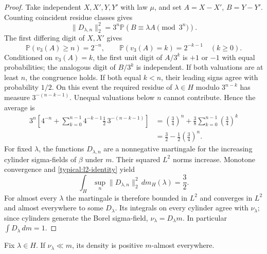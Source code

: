 \begin{proof}
Take independent $X,X',Y,Y'$ with law $\mu$, and set
$A=X-X'$, $B=Y-Y'$. Counting coincident residue classes gives
\[
 \|D_{\lambda,n}\|_2^2
       =3^n\mathbb P(B\equiv\lambda A\pmod{3^n}).
\]
The first differing digit of $X,X'$ gives
\[
 \mathbb P(v_3(A)\ge n)=2^{-n},\qquad
 \mathbb P(v_3(A)=k)=2^{-k-1}\quad(k\ge0).
\]
Conditioned on $v_3(A)=k$, the first unit digit of $A/3^k$
is $+1$ or $-1$ with equal probabilities; the analogous digit of
$B/3^k$ is independent. If both valuations are at least $n$, the
congruence holds. If both equal $k<n$, their leading signs agree
with probability $1/2$. On this event the required residue of
$\lambda\in H$ modulo $3^{n-k}$ has measure $3^{-(n-k-1)}$.
Unequal valuations below $n$ cannot contribute. Hence the average is
\begin{align*}
 3^n\left[4^{-n}+
   \sum_{k=0}^{n-1}4^{-k-1}\frac12\,3^{-(n-k-1)}\right]
 &=\left(\frac34\right)^n+
   \frac38\sum_{k=0}^{n-1}\left(\frac34\right)^k\\
 &=\frac32-\frac12\left(\frac34\right)^n.
\end{align*}
For fixed $\lambda$, the functions $D_{\lambda,n}$ are a
nonnegative martingale for the increasing cylinder sigma-fields of
$\beta$ under $m$. Their squared $L^2$ norms increase. Monotone
convergence and \eqref{typical:l2-identity} yield
\[
 \int_H\sup_n\|D_{\lambda,n}\|_2^2\,dm_H(\lambda)=\frac32.
\]
For almost every $\lambda$ the martingale is therefore bounded in
$L^2$ and converges in $L^2$ and almost everywhere to some $D_\lambda$.
Its integrals on every cylinder agree with $\nu_\lambda$; since
cylinders generate the Borel sigma-field, $\nu_\lambda=D_\lambda m$.
In particular $\int D_\lambda\,dm=1$.
\end{proof}

\begin{lemma}\label{typical:positive}
Fix $\lambda\in H$. If $\nu_\lambda\ll m$, its density is positive
$m$-almost everywhere.
\end{lemma}

